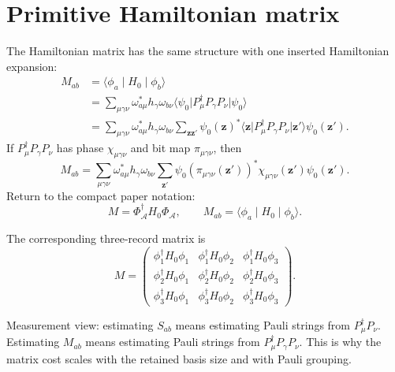 \documentclass[10pt,twocolumn]{article}
\newcommand{\Acal}{\mathcal A}
\newcommand{\ket}[1]{\lvert #1\rangle}
\newcommand{\bra}[1]{\langle #1\rvert}
\newcommand{\matel}[3]{\langle #1\mid #2\mid #3\rangle}
\begin{document}
\section{Primitive Hamiltonian matrix}

The Hamiltonian matrix has the same structure with one inserted Hamiltonian expansion:
\begin{equation}
\begin{aligned}
M_{ab}
&=\matel{\phi_a}{H_0}{\phi_b}\\
&=\sum_{\mu\gamma\nu}
\omega_{a\mu}^*h_\gamma\omega_{b\nu}
\bra{\psi_0}P_\mu^\dagger P_\gamma P_\nu\ket{\psi_0}\\
&=\sum_{\mu\gamma\nu}
\omega_{a\mu}^*h_\gamma\omega_{b\nu}
\sum_{\mathbf z\mathbf z'}
\psi_0(\mathbf z)^*
\bra{\mathbf z}P_\mu^\dagger P_\gamma P_\nu\ket{\mathbf z'}
\psi_0(\mathbf z').
\end{aligned}
\label{eq:M_chain}
\end{equation}
If \(P_\mu^\dagger P_\gamma P_\nu\) has phase \(\chi_{\mu\gamma\nu}\) and bit map \(\pi_{\mu\gamma\nu}\), then
\begin{equation}
M_{ab}=
\sum_{\mu\gamma\nu}\omega_{a\mu}^*h_\gamma\omega_{b\nu}
\sum_{\mathbf z'}
\psi_0(\pi_{\mu\gamma\nu}(\mathbf z'))^*
\chi_{\mu\gamma\nu}(\mathbf z')
\psi_0(\mathbf z').
\label{eq:M_bit_final}
\end{equation}
Return to the compact paper notation:
\begin{equation}
M=\Phi_\Acal^\dagger H_0\Phi_\Acal,
\qquad
M_{ab}=\matel{\phi_a}{H_0}{\phi_b}.
\label{eq:M_high_return}
\end{equation}

The corresponding three-record matrix is
\begin{equation}
M=
\begin{pmatrix}
\phi_1^\dagger H_0\phi_1&\phi_1^\dagger H_0\phi_2&\phi_1^\dagger H_0\phi_3\\
\phi_2^\dagger H_0\phi_1&\phi_2^\dagger H_0\phi_2&\phi_2^\dagger H_0\phi_3\\
\phi_3^\dagger H_0\phi_1&\phi_3^\dagger H_0\phi_2&\phi_3^\dagger H_0\phi_3
\end{pmatrix}.
\label{eq:M_matrix_shape}
\end{equation}

\begin{paperbox}
Measurement view: estimating \(S_{ab}\) means estimating Pauli strings from \(P_\mu^\dagger P_\nu\). Estimating \(M_{ab}\) means estimating Pauli strings from \(P_\mu^\dagger P_\gamma P_\nu\). This is why the matrix cost scales with the retained basis size and with Pauli grouping.
\end{paperbox}
\end{document}
